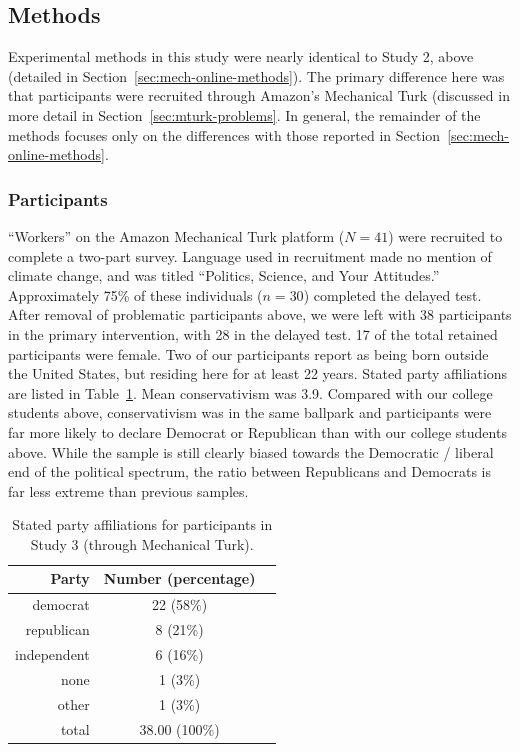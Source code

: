 \subsection{Methods}

Experimental methods in this study were nearly identical to Study 2, above
(detailed in Section~\ref{sec:mech-online-methods}). The primary difference here
was that participants were recruited through Amazon's Mechanical Turk (discussed
in more detail in Section~\ref{sec:mturk-problems}. In general, the remainder of the
methods focuses only on the differences with those reported in
Section~\ref{sec:mech-online-methods}.

\subsubsection{Participants}

“Workers” on the Amazon Mechanical Turk platform ($N=41$) were recruited to
complete a two-part survey. Language used in recruitment made no mention of
climate change, and was titled “Politics, Science, and Your Attitudes.”
Approximately 75\% of these individuals ($n=30$) completed the delayed test.
After removal of problematic participants above, we were left with 38
participants in the primary intervention, with 28 in the delayed test. 17 of the
total retained participants were female. Two of our participants report as being
born outside the United States, but residing here for at least 22 years. Stated
party affiliations are listed in Table~\ref{table:cco-mech-party}. Mean
conservativism was 3.9. Compared with our college students above, conservativism
was in the same ballpark and participants were far more likely to declare
Democrat or Republican than with our college students above. While the sample is
still clearly biased towards the Democratic / liberal end of the political
spectrum, the ratio between Republicans and Democrats is far less extreme than
previous samples. 

\begin{table}[ht]
    \caption{Stated party affiliations for participants in Study 3 (through
        Mechanical Turk).}
    \label{table:cco-mech-party}
\centering
\begin{tabular}{rcc}
  \toprule
 Party & Number (percentage) \\ 
  \midrule
  democrat     & 22 (58\%) \\ 
  republican   & 8 (21\%) \\ 
  independent  & 6 (16\%) \\ 
  none         & 1 (3\%) \\ 
  other        & 1 (3\%) \\ 
  \midrule
  total        & 38.00 (100\%) \\ 
   \bottomrule
\end{tabular}
\end{table}

